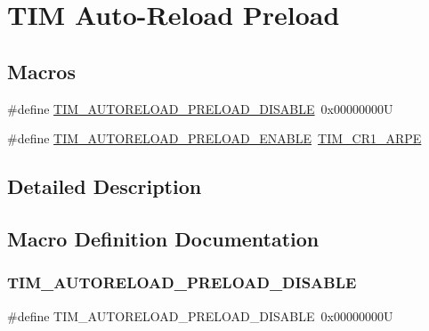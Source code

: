 \hypertarget{group___t_i_m___auto_reload_preload}{}\section{T\+IM Auto-\/\+Reload Preload}
\label{group___t_i_m___auto_reload_preload}
\subsection*{Macros}
\begin{DoxyCompactItemize}
\item 
\#define \mbox{\hyperlink{group___t_i_m___auto_reload_preload_ga4d0cf7e2800d0ab10f3f0ebfac11c9c7}{T\+I\+M\+\_\+\+A\+U\+T\+O\+R\+E\+L\+O\+A\+D\+\_\+\+P\+R\+E\+L\+O\+A\+D\+\_\+\+D\+I\+S\+A\+B\+LE}}~0x00000000U
\item 
\#define \mbox{\hyperlink{group___t_i_m___auto_reload_preload_gaaa36f0c74b1d1ec83b0c105bfedfa309}{T\+I\+M\+\_\+\+A\+U\+T\+O\+R\+E\+L\+O\+A\+D\+\_\+\+P\+R\+E\+L\+O\+A\+D\+\_\+\+E\+N\+A\+B\+LE}}~\mbox{\hyperlink{group___peripheral___registers___bits___definition_ga4a3ad409f6b147cdcbafbfe29102f3fd}{T\+I\+M\+\_\+\+C\+R1\+\_\+\+A\+R\+PE}}
\end{DoxyCompactItemize}


\subsection{Detailed Description}


\subsection{Macro Definition Documentation}
\mbox{\label{group___t_i_m___auto_reload_preload_ga4d0cf7e2800d0ab10f3f0ebfac11c9c7}} 
\subsubsection{\texorpdfstring{TIM\_AUTORELOAD\_PRELOAD\_DISABLE}{TIM\_AUTORELOAD\_PRELOAD\_DISABLE}}
{\footnotesize\ttfamily \#define T\+I\+M\+\_\+\+A\+U\+T\+O\+R\+E\+L\+O\+A\+D\+\_\+\+P\+R\+E\+L\+O\+A\+D\+\_\+\+D\+I\+S\+A\+B\+LE~0x00000000U}

